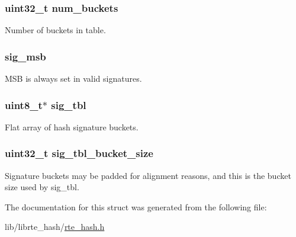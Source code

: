 \subsubsection[{num\+\_\+buckets}]{\setlength{\rightskip}{0pt plus 5cm}uint32\+\_\+t num\+\_\+buckets}\label{structrte__hash_aa457ee935be1ba725024ac93fd2b2896}
Number of buckets in table. \hypertarget{structrte__hash_a17ac80472532608bad56604064f4ed77}{}
\subsubsection[{sig\+\_\+msb}]{ sig\+\_\+msb}\label{structrte__hash_a17ac80472532608bad56604064f4ed77}
M\+S\+B is always set in valid signatures. \hypertarget{structrte__hash_aa92b2a3ccd0e79ebaafdf2073ea5eaa5}{}
\subsubsection[{sig\+\_\+tbl}]{\setlength{\rightskip}{0pt plus 5cm}uint8\+\_\+t$\ast$ sig\+\_\+tbl}\label{structrte__hash_aa92b2a3ccd0e79ebaafdf2073ea5eaa5}
Flat array of hash signature buckets. \hypertarget{structrte__hash_a7f46f8e3d54c9e6a98604123e9dbce11}{}
\subsubsection[{sig\+\_\+tbl\+\_\+bucket\+\_\+size}]{\setlength{\rightskip}{0pt plus 5cm}uint32\+\_\+t sig\+\_\+tbl\+\_\+bucket\+\_\+size}\label{structrte__hash_a7f46f8e3d54c9e6a98604123e9dbce11}
Signature buckets may be padded for alignment reasons, and this is the bucket size used by sig\+\_\+tbl. 

The documentation for this struct was generated from the following file\+:\begin{DoxyCompactItemize}
\item 
lib/librte\+\_\+hash/\hyperlink{rte__hash_8h}{rte\+\_\+hash.\+h}\end{DoxyCompactItemize}
